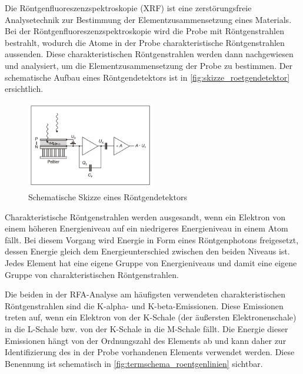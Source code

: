 \documentclass[12pt,english,ngerman]{scrartcl}
\begin{document}
Die Röntgenfluoreszenzspektroskopie (XRF) ist eine zerstörungsfreie
Analysetechnik zur Bestimmung der Elementzusammensetzung eines Materials. Bei
der Röntgenfluoreszenzspektroskopie wird die Probe mit Röntgenstrahlen
bestrahlt, wodurch die Atome in der Probe charakteristische Röntgenstrahlen
aussenden. Diese charakteristischen Röntgenstrahlen werden dann nachgewiesen
und analysiert, um die Elementzusammensetzung der Probe zu bestimmen. Der
schematische Aufbau eines Röntgendetektors ist in
\autoref{fig:skizze_roetgendetektor} ersichtlich.

\begin{figure}[H]
	\begin{center}
		\includegraphics[width =0.5\textwidth]{./figures/skizze_roentgendetektor.PNG}
	\end{center}
	\caption[Schematische Skizze eines Röntgendetektors] {Schematische Skizze eines
		Röntgendetektors \cite{koller_experimente_nodate}
	}\label{fig:skizze_roetgendetektor}
\end{figure}

Charakteristische Röntgenstrahlen werden ausgesandt, wenn ein Elektron von
einem höheren Energieniveau auf ein niedrigeres Energieniveau in einem Atom
fällt. Bei diesem Vorgang wird Energie in Form eines Röntgenphotons
freigesetzt, dessen Energie gleich dem Energieunterschied zwischen den beiden
Niveaus ist. Jedes Element hat eine eigene Gruppe von Energieniveaus und damit
eine eigene Gruppe von charakteristischen Röntgenstrahlen.

Die beiden in der RFA-Analyse am häufigsten verwendeten charakteristischen
Röntgenstrahlen sind die K-alpha- und K-beta-Emissionen. Diese Emissionen
treten auf, wenn ein Elektron von der K-Schale (der äußersten Elektronenschale)
in die L-Schale bzw. von der K-Schale in die M-Schale fällt. Die Energie dieser
Emissionen hängt von der Ordnungszahl des Elements ab und kann daher zur
Identifizierung des in der Probe vorhandenen Elements verwendet werden. Diese
Benennung ist schematisch in \autoref{fig:termschema_roentgenlinien} sichtbar.
\end{document}
